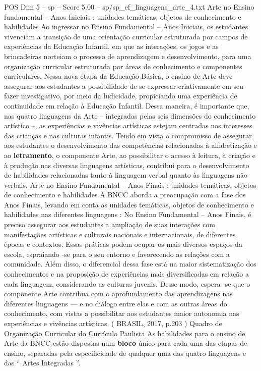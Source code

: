 \begin{textsample}{POS Dim 5 – sp – Score 5.00 – sp/sp\_ef\_linguagens\_arte\_4.txt}  \label{ex:f5_pos_076}
Arte no Ensino fundamental – Anos Iniciais : unidades temáticas, objetos de conhecimento e habilidades Ao ingressar no Ensino Fundamental – Anos Iniciais, os estudantes vivenciam a transição de uma orientação curricular estruturada por campos de experiências da Educação Infantil, em que as interações, os jogos e as brincadeiras norteiam o processo de aprendizagem e desenvolvimento, para uma organização curricular estruturada por áreas de conhecimento e componentes curriculares.
Nessa nova etapa da Educação Básica, o ensino de Arte deve assegurar aos estudantes a possibilidade de se expressar criativamente em seu fazer investigativo, por meio da ludicidade, propiciando uma experiência de continuidade em relação à Educação Infantil.
Dessa maneira, é importante que, nas quatro linguagens da Arte – integradas pelas seis dimensões do conhecimento artístico –, as experiências e vivências artísticas estejam centradas nos interesses das crianças e nas culturas infantis.
Tendo em vista o compromisso de assegurar aos estudantes o desenvolvimento das competências relacionadas à alfabetização e ao \textbf{letramento}, o componente Arte, ao possibilitar o acesso à leitura, à criação e à produção nas diversas linguagens artísticas, contribui para o desenvolvimento de habilidades relacionadas tanto à linguagem verbal quanto às linguagens não verbais.
Arte no Ensino Fundamental – Anos Finais : unidades temáticas, objetos de conhecimento e habilidades A BNCC aborda a preocupação com a fase dos Anos Finais, levando em conta as unidades temáticas, objetos de conhecimento e habilidades nas diferentes linguagens : No Ensino Fundamental – Anos Finais, é preciso assegurar aos estudantes a ampliação de suas interações com manifestações artísticas e culturais nacionais e internacionais, de diferentes épocas e contextos.
Essas práticas podem ocupar os mais diversos espaços da escola, espraiando -se para o seu entorno e favorecendo as relações com a comunidade.
Além disso, o diferencial dessa fase está na maior sistematização dos conhecimentos e na proposição de experiências mais diversificadas em relação a cada linguagem, considerando as culturas juvenis.
Desse modo, espera -se que o componente Arte contribua com o aprofundamento das aprendizagens nas diferentes linguagens — e no diálogo entre elas e com as outras áreas do conhecimento, com vistas a possibilitar aos estudantes maior autonomia nas experiências e vivências artísticas. ( BRASIL, 2017, p.203 ) Quadro de Organização Curricular do Currículo Paulista As habilidades para o ensino de Arte da BNCC estão dispostas num \textbf{bloco} único para cada uma das etapas de ensino, separadas pela especificidade de qualquer uma das quatro linguagens e das “ Artes Integradas ”.

\end{textsample}
